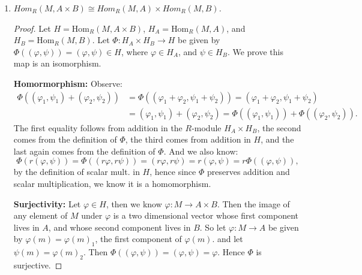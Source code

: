 \documentclass[9pt,reqno,twoside]{amsbook}
\theoremstyle{plain}
\numberwithin{section}{chapter}
\numberwithin{equation}{chapter}
\theoremstyle{definition}
\theoremstyle{remark}
\theoremstyle{plain}
\renewcommand{\phi}{\varphi}
\begin{document}
\begin{enumerate}[label=\arabic*.]
\begin{enumerate}
\begin{proof}
\textbf{Surjectivity: } Let $\phi \in H$. Then $\phi:A\times B \to M$. So let $\phi \in H_A$ be given by $\phi(a) = \phi(a,0)$,
and let $\psi \in H_B$ be given by $\phi(b) = \phi(0,b)$. Then we have: $\Phi((\phi,\psi)) = \phi$.  Then $\Phi$ is surjective. 


\textbf{Injectivity: } Let $\Phi((\phi_1,\psi_1)) = \phi_1 + \psi_1 = \phi_2 + \psi_2 = \Phi((\phi_2,\psi_2)) \in H_A \times H_B$. Then note that 
$$
(\phi_1 + \psi_1)(a,0) = \phi_1(a) = \phi_2(a) = (\phi_2 + \psi_2)(a,0),
$$
and the same holds when we let $a = 0$, and use an arbitrary $b$ value, so we get that $\psi_1 = \psi_2$ as well. Hence $\Phi$ is injective. And thus it is an isomorphism. 
\end{proof}
\item \textit{$Hom_R (M,A \times B) \cong Hom_R(M,A) \times Hom_R(M,B)$.}
\begin{proof}
Let $H = \text{Hom}_R(M, A\times B)$, $H_A = \text{Hom}_R(M,A)$, and $H_B = \text{Hom}_R(M,B)$. Let $\Phi:H_A \times H_B \to H$ be given by $\Phi((\phi,\psi)) = (\phi,\psi) \in H$, where $\phi \in H_A$, and $\psi \in H_B$. We prove this map is an isomorphism. 

\textbf{Homormorphism: }Observe: 
\begin{equation}
\begin{aligned}
\Phi((\phi_1,\psi_1) + (\phi_2,\psi_2)) &= \Phi((\phi_1 + \phi_2,\psi_1 + \psi_2)) = (\phi_1 + \phi_2,\psi_1 + \psi_2)\\ &=(\phi_1,\psi_1) + (\phi_2,\psi_2) =  \Phi((\phi_1,\psi_1)) + \Phi((\phi_2,\psi_2)).
\end{aligned}
\end{equation}
The first equality follows from addition in the $R$-module $H_A \times H_B$, the second comes from the definition of $\Phi$, the third comes from addition in $H$, and the last again comes from the definition of $\Phi$.  And we also know: 
$$
\Phi(r(\phi,\psi)) = \Phi((r\phi,r\psi)) = (r\phi,r\psi) = r(\phi , \psi) = r\Phi((\phi,\psi)),
$$
by the definition of scalar mult. in $H$, hence since $\Phi$ preserves addition and scalar multiplication, we know it is a homomorphism. 

\textbf{Surjectivity: } Let $\phi \in H$, then we know $\phi: M \to A \times B$. Then the image of any element of $M$ under $\phi$ is a two dimensional vector whose first component lives in $A$, and whose second component lives in $B$. So let $\phi:M \to A$ be given by $\phi(m) = \phi(m)_1$, the first component of $\phi(m)$. and let $\psi(m) = \phi(m)_2$. Then $\Phi((\phi,\psi)) = (\phi,\psi) = \phi$. Hence $\Phi$ is surjective. 


\end{proof}
\end{enumerate}
\end{enumerate}
\end{document}
